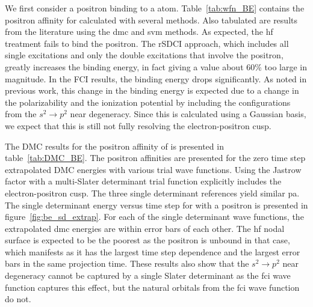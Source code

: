 We first consider a positron binding to a  atom. 
Table~\ref{tab:wfn_BE} contains the positron affinity for  calculated with several methods.
Also tabulated are results from the literature using the \gls{dmc} and \gls{svm} methods.
As expected, the \gls{hf} treatment fails to bind the positron.
The \gls{rSDCI} approach, which includes all single excitations and only the double excitations that involve the positron, greatly increases the binding energy, in fact giving a value about 60\% too large in magnitude.
In the FCI results, the binding energy drops significantly.
As noted in previous work, this change in the binding energy is expected due to a change in the polarizability and the ionization potential by including the configurations from the $s^2 \rightarrow p^2$ near degeneracy.\cite{10.1063/1.1486447}
Since this is calculated using a Gaussian basis, we expect that this is still not fully resolving the electron-positron cusp.

The DMC results for the positron affinity of  is presented in table~\ref{tab:DMC_BE}.
The positron affinities are presented for the zero time step extrapolated DMC energies with various trial wave functions.
Using the Jastrow factor with a multi-Slater determinant trial function explicitly includes the electron-positron cusp.
The three single determinant references yield similar \gls{pa}.
The single determinant energy versus time step for  with a positron is presented in figure~\ref{fig:be_sd_extrap}.
For each of the single determinant wave functions, the extrapolated \gls{dmc} energies are within error bars of each other.
The \gls{hf} nodal surface is expected to be the poorest as the positron is unbound in that case, which manifests as it has the largest time step dependence and the largest error bars in the same projection time.
These results also show that the $s^2 \rightarrow p^2$ near degeneracy cannot be captured by a single Slater determinant as the \gls{fci} wave function captures this effect, but the natural orbitals from the \gls{fci} wave function do not.

